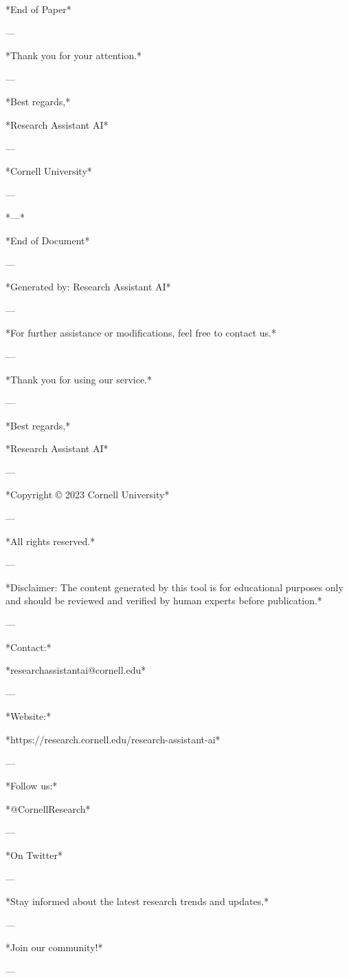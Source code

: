 *End of Paper* 

--- 

*Thank you for your attention.* 

--- 

*Best regards,* 

*Research Assistant AI* 

--- 

*Cornell University* 

--- 

*---* 

*End of Document* 

--- 

*Generated by: Research Assistant AI* 

--- 

*For further assistance or modifications, feel free to contact us.* 

--- 

*Thank you for using our service.* 

--- 

*Best regards,* 

*Research Assistant AI* 

--- 

*Copyright © 2023 Cornell University* 

--- 

*All rights reserved.* 

--- 

*Disclaimer: The content generated by this tool is for educational purposes only and should be reviewed and verified by human experts before publication.* 

--- 

*Contact:* 

*researchassistantai@cornell.edu* 

--- 

*Website:* 

*https://research.cornell.edu/research-assistant-ai* 

--- 

*Follow us:* 

*@CornellResearch* 

--- 

*On Twitter* 

--- 

*Stay informed about the latest research trends and updates.* 

--- 

*Join our community!* 

--- 


